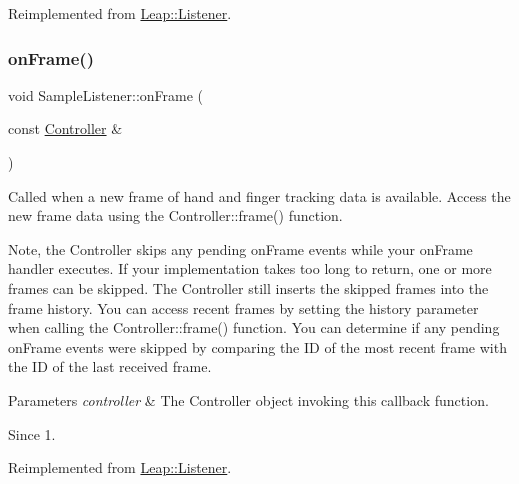 Reimplemented from \hyperlink{class_leap_1_1_listener_ab600421108bbc952d8f0f144384ca30f}{Leap\+::\+Listener}.

\mbox{\label{class_sample_listener_a39698af250954a27afb4a875ff0af38a}} 
\subsubsection{\texorpdfstring{on\+Frame()}{onFrame()}\hspace{0.1cm}{\footnotesize\ttfamily [2/2]}}
{\footnotesize\ttfamily void Sample\+Listener\+::on\+Frame (\begin{DoxyParamCaption}\item[{const \hyperlink{class_leap_1_1_controller}{Controller} \&}]{ }\end{DoxyParamCaption})\hspace{0.3cm}{\ttfamily [virtual]}}

Called when a new frame of hand and finger tracking data is available. Access the new frame data using the Controller\+::frame() function.


\begin{DoxyCodeInclude}
\end{DoxyCodeInclude}


Note, the Controller skips any pending on\+Frame events while your on\+Frame handler executes. If your implementation takes too long to return, one or more frames can be skipped. The Controller still inserts the skipped frames into the frame history. You can access recent frames by setting the history parameter when calling the Controller\+::frame() function. You can determine if any pending on\+Frame events were skipped by comparing the ID of the most recent frame with the ID of the last received frame.


\begin{DoxyParams}{Parameters}
{\em controller} & The Controller object invoking this callback function. \\
\hline
\end{DoxyParams}
\begin{DoxySince}{Since}
1. 
\end{DoxySince}


Reimplemented from \hyperlink{class_leap_1_1_listener_ab600421108bbc952d8f0f144384ca30f}{Leap\+::\+Listener}.

